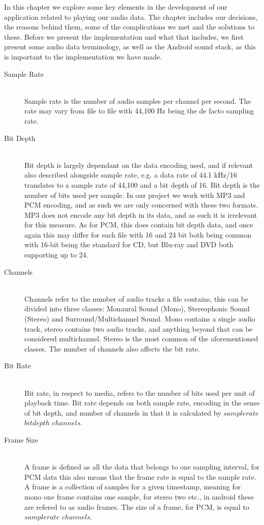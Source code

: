 In this chapter we explore some key elements in the development of our application related to playing our audio data.
The chapter includes our decisions, the reasons behind them, some of the complications we met and the solutions to these.
Before we present the implementation and what that includes, we first present some audio data terminology, as well as the Android sound stack, as this is important to the implementation we have made.
\begin{description}
    \item [Sample Rate] \cite{sample_rate_std} \hfill \\
    Sample rate is the number of audio samples per channel per second.
    The rate may vary from file to file with 44,100 Hz being the de facto sampling rate.
    \item [Bit Depth] \cite{bit_depth} \hfill \\
    Bit depth is largely dependant on the data encoding used, and if relevant also described alongside sample rate, e.g. a data rate of 44.1 kHz/16 translates to a sample rate of 44,100 and a bit depth of 16.
    Bit depth is the number of bits used per sample.
    In our project we work with MP3 and PCM encoding, and as such we are only concerned with these two formats.
    MP3 does not encode any bit depth in its data, and as such it is irrelevant for this measure.
    As for PCM, this does contain bit depth data, and once again this may differ for each file with 16 and 24 bit both being common with 16-bit being the standard for CD, but Blu-ray and DVD both supporting up to 24.
    \item [Channels] \cite{channels} \hfill \\
    Channels refer to the number of audio tracks a file contains, this can be divided into three classes: Monaural Sound (Mono), Stereophonic Sound (Stereo) and Surround/Multichannel Sound.
    Mono contains a single audio track, stereo contains two audio tracks, and anything beyond that can be considered multichannel.
    Stereo is the most common of the aforementioned classes.
    The number of channels also affects the bit rate.
    \item [Bit Rate] \cite{bit_rate} \hfill \\ 
    Bit rate, in respect to media, refers to the number of bits used per unit of playback time.
    Bit rate depends on both sample rate, encoding in the sense of bit depth, and number of channels in that it is calculated by $sample rate$ \times $bit depth$ \times $channels$.
    \item [Frame Size] \cite{audioformat} \hfill \\
    A frame is defined as all the data that belongs to one sampling interval, for PCM data this also means that the frame rate is equal to the sample rate.
    A frame is a collection of samples for a given timestamp, meaning for mono one frame contains one sample, for stereo two etc., in android these are refered to as audio frames.
    The size of a frame, for PCM, is equal to $sample rate$ \times $channels$.
\end{description}
